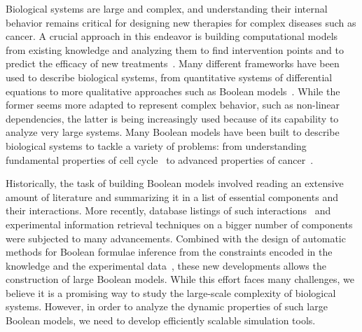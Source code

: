 \documentclass[sn-mathphys-num]{sn-jnl}%
\begin{document}
Biological systems are large and complex, and understanding their internal behavior remains critical for designing new therapies for complex diseases such as cancer.
A crucial approach in this endeavor is building computational models from existing knowledge and analyzing them to find intervention points and to predict the efficacy of new treatments~\cite{brodland2015computational,bongrand2023understanding}.
Many different frameworks have been used to describe biological systems, from quantitative systems of differential equations to more qualitative approaches such as Boolean models~\cite{machado2011modeling}.
While the former seems more adapted to represent complex behavior, such as non-linear dependencies, the latter is being increasingly used because of its capability to analyze very large systems.
Many Boolean models have been built to describe biological systems to tackle a variety of problems: from understanding fundamental properties of cell cycle~\cite{faure2006cellcycle,sizek2019boolean} to advanced properties of cancer~\cite{fumia_carcinogenesis_2013,wooten_sclg,montagud2022prostate}.

Historically, the task of building Boolean models involved reading an extensive amount of literature and summarizing it in a list of essential components and their interactions.
More recently, database listings of such interactions~\cite{licata2020signor,turei2016omnipath} and experimental information retrieval techniques on a bigger number of components were subjected to many advancements. Combined with the design of automatic methods for Boolean formulae inference from the constraints encoded in the knowledge and the experimental data~\cite{10.1093/bioinformatics/btaa484,chevalier2020synthesis,benevs2023boolean,prugger_unsupervised}, these new developments allows the construction of large Boolean models.
While this effort faces many challenges, we believe it is a promising way to study the large-scale complexity of biological systems.
However, in order to analyze the dynamic properties of such large Boolean models, we need to develop efficiently scalable simulation tools. 
\end{document}
